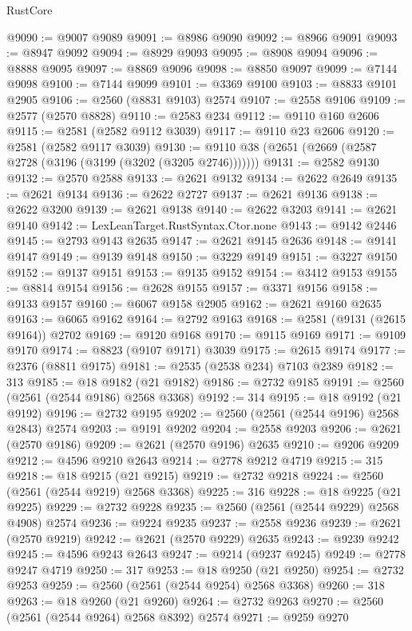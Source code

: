 \begin{lexlean}{RustCore}
\begin{coremodule}
@9090 := @9007 @9089
@9091 := @8986 @9090
@9092 := @8966 @9091
@9093 := @8947 @9092
@9094 := @8929 @9093
@9095 := @8908 @9094
@9096 := @8888 @9095
@9097 := @8869 @9096
@9098 := @8850 @9097
@9099 := @7144 @9098
@9100 := @7144 @9099
@9101 := @3369 @9100
@9103 := @8833 @9101 @2905
@9106 := @2560 (@8831 @9103) @2574
@9107 := @2558 @9106
@9109 := @2577 (@2570 @8828)
@9110 := @2583 @234
@9112 := @9110 @160 @2606
@9115 := @2581 (@2582 @9112 @3039)
@9117 := @9110 @23 @2606
@9120 := @2581 (@2582 @9117 @3039)
@9130 := @9110 @38 (@2651 (@2669 (@2587 @2728 (@3196 (@3199 (@3202 (@3205 @2746)))))))
@9131 := @2582 @9130
@9132 := @2570 @2588
@9133 := @2621 @9132
@9134 := @2622 @2649
@9135 := @2621 @9134
@9136 := @2622 @2727
@9137 := @2621 @9136
@9138 := @2622 @3200
@9139 := @2621 @9138
@9140 := @2622 @3203
@9141 := @2621 @9140
@9142 := LexLeanTarget.RustSyntax.Ctor.none
@9143 := @9142 @2446
@9145 := @2793 @9143 @2635
@9147 := @2621 @9145 @2636
@9148 := @9141 @9147
@9149 := @9139 @9148
@9150 := @3229 @9149
@9151 := @3227 @9150
@9152 := @9137 @9151
@9153 := @9135 @9152
@9154 := @3412 @9153
@9155 := @8814 @9154
@9156 := @2628 @9155
@9157 := @3371 @9156
@9158 := @9133 @9157
@9160 := @6067 @9158 @2905
@9162 := @2621 @9160 @2635
@9163 := @6065 @9162
@9164 := @2792 @9163
@9168 := @2581 (@9131 (@2615 @9164)) @2702
@9169 := @9120 @9168
@9170 := @9115 @9169
@9171 := @9109 @9170
@9174 := @8823 (@9107 @9171) @3039
@9175 := @2615 @9174
@9177 := @2376 (@8811 @9175)
@9181 := @2535 (@2538 @234) @7103 @2389
@9182 := 313
@9185 := @18 @9182 (@21 @9182)
@9186 := @2732 @9185
@9191 := @2560 (@2561 (@2544 @9186) @2568 @3368)
@9192 := 314
@9195 := @18 @9192 (@21 @9192)
@9196 := @2732 @9195
@9202 := @2560 (@2561 (@2544 @9196) @2568 @2843) @2574
@9203 := @9191 @9202
@9204 := @2558 @9203
@9206 := @2621 (@2570 @9186)
@9209 := @2621 (@2570 @9196) @2635
@9210 := @9206 @9209
@9212 := @4596 @9210 @2643
@9214 := @2778 @9212 @4719
@9215 := 315
@9218 := @18 @9215 (@21 @9215)
@9219 := @2732 @9218
@9224 := @2560 (@2561 (@2544 @9219) @2568 @3368)
@9225 := 316
@9228 := @18 @9225 (@21 @9225)
@9229 := @2732 @9228
@9235 := @2560 (@2561 (@2544 @9229) @2568 @4908) @2574
@9236 := @9224 @9235
@9237 := @2558 @9236
@9239 := @2621 (@2570 @9219)
@9242 := @2621 (@2570 @9229) @2635
@9243 := @9239 @9242
@9245 := @4596 @9243 @2643
@9247 := @9214 (@9237 @9245)
@9249 := @2778 @9247 @4719
@9250 := 317
@9253 := @18 @9250 (@21 @9250)
@9254 := @2732 @9253
@9259 := @2560 (@2561 (@2544 @9254) @2568 @3368)
@9260 := 318
@9263 := @18 @9260 (@21 @9260)
@9264 := @2732 @9263
@9270 := @2560 (@2561 (@2544 @9264) @2568 @8392) @2574
@9271 := @9259 @9270

\end{coremodule}
\end{lexlean}
